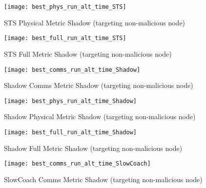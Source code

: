 \documentclass[aspectratio=169]{beamer}
\begin{document}
\begin{frame}\begin{figure}[h]
	\centering
	\texttt{[image: best\_phys\_run\_alt\_time\_STS]}
	\caption{STS Physical Metric Shadow (targeting non-malicious node)}
	\label{fig:phys_alt_time_sts}
\end{figure}\end{frame}

\begin{frame}\begin{figure}[h]
	\centering
	\texttt{[image: best\_full\_run\_alt\_time\_STS]}
	\caption{STS Full Metric Shadow (targeting non-malicious node)}
	\label{fig:full_alt_time_sts}
\end{figure}\end{frame}



\begin{frame}\begin{figure}[h]
	\centering
	\texttt{[image: best\_comms\_run\_alt\_time\_Shadow]}
	\caption{Shadow Comms Metric Shadow (targeting non-malicious node)}
	\label{fig:comms_alt_time_shadow}
\end{figure}\end{frame}

\begin{frame}\begin{figure}[h]
	\centering
	\texttt{[image: best\_phys\_run\_alt\_time\_Shadow]}
	\caption{Shadow Physical Metric Shadow (targeting non-malicious node)}
	\label{fig:phys_alt_time_shadow}
\end{figure}\end{frame}

\begin{frame}\begin{figure}[h]
	\centering
	\texttt{[image: best\_full\_run\_alt\_time\_Shadow]}
	\caption{Shadow Full Metric Shadow (targeting non-malicious node)}
	\label{fig:full_alt_time_shadow}
\end{figure}\end{frame}



\begin{frame}\begin{figure}[h]
	\centering
	\texttt{[image: best\_comms\_run\_alt\_time\_SlowCoach]}
	\caption{SlowCoach Comms Metric Shadow (targeting non-malicious node)}
	\label{fig:comms_alt_time_slowcoach}
\end{figure}\end{frame}
\end{document}

